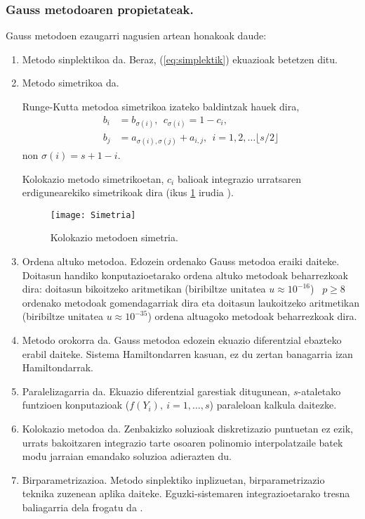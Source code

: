 \subsubsection*{Gauss metodoaren propietateak.}

Gauss metodoen ezaugarri nagusien artean honakoak daude:  
\begin{enumerate}
\item Metodo sinplektikoa da. Beraz, (\ref{eq:simplektik}) ekuazioak betetzen ditu. 
 
\item{Metodo simetrikoa da.}

Runge-Kutta metodoa simetrikoa izateko baldintzak hauek dira,
\begin{align*}
\label {eq:2}
 b_{i} &= b_{\sigma(i)} ,\ \  c_{\sigma(i)}= 1-c_{i}, \\
 b_{j} &= a_{\sigma(i),\sigma(j)}+a_{i,j}, \ \  i=1,2,\dots \lfloor s/2\rfloor
 \end{align*} 
non $\sigma(i)=s+1-i$.

Kolokazio metodo simetrikoetan, $c_i$ balioak integrazio urratsaren erdigunearekiko simetrikoak dira (ikus \ref{fig:simetrikoa} irudia  ).  
 \begin{figure}[h]
 \centering
 \texttt{[image: Simetria]}
 \caption{ \small Kolokazio metodoen simetria.}
 \label{fig:simetrikoa}
 \end{figure}
 
\item{Ordena altuko metodoa.}
Edozein ordenako Gauss metodoa eraiki daiteke. Doitasun handiko konputazioetarako ordena altuko metodoak beharrezkoak dira: doitasun bikoitzeko aritmetikan (biribiltze unitatea $u\approx10^{-16}$) ~$p\geqslant8$ ordenako metodoak gomendagarriak dira eta doitasun laukoitzeko aritmetikan (biribiltze unitatea $u\approx10^{-35}$) ordena altuagoko metodoak beharrezkoak dira.  

\item{Metodo orokorra da.}
Gauss metodoa edozein ekuazio diferentzial ebazteko erabil daiteke. Sistema Hamiltondarren kasuan, ez du zertan banagarria izan  Hamiltondarrak.

\item{Paralelizagarria da.}
Ekuazio diferentzial garestiak ditugunean, $s$-ataletako funtzioen konputazioak ($f(Y_i), \ i=1,\dots,s$) paraleloan kalkula daitezke.  

\item{Kolokazio metodoa da.}
Zenbakizko soluzioak diskretizazio puntuetan ez ezik, urrats bakoitzaren integrazio tarte osoaren polinomio interpolatzaile batek modu jarraian emandako soluzioa adierazten du.


\item{Birparametrizazioa.}
Metodo sinplektiko inplizuetan, birparametrizazio teknika zuzenean aplika daiteke. Eguzki-sistemaren integrazioetarako tresna baliagarria dela frogatu da \cite{Fukushima2007}. 
  
\end{enumerate}

